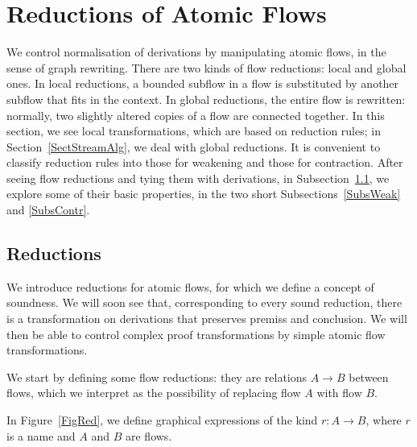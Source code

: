 \documentclass[a4paper]{LMCS}
\begin{document}
\section{Reductions of Atomic Flows}\label{SectRed}

We control normalisation of derivations by manipulating atomic flows, in the sense of graph rewriting. There are two kinds of flow reductions: local and global ones. In local reductions, a bounded subflow in a flow is substituted by another subflow that fits in the context. In global reductions, the entire flow is rewritten: normally, two slightly altered copies of a flow are connected together. In this section, we see local transformations, which are based on reduction rules; in Section~\ref{SectStreamAlg}, we deal with global reductions. It is convenient to classify reduction rules into those for weakening and those for contraction. After seeing flow reductions and tying them with derivations, in Subsection~\ref{SubsRed}, we explore some of their basic properties, in the two short Subsections~\ref{SubsWeak} and \ref{SubsContr}.

\subsection{Reductions}\label{SubsRed}

We introduce reductions for atomic flows, for which we define a concept of soundness. We will soon see that, corresponding to every sound reduction, there is a transformation on derivations that preserves premiss and conclusion. We will then be able to control complex proof transformations by simple atomic flow transformations.

We start by defining some flow reductions: they are relations $A\to B$ between flows, which we interpret as the possibility of replacing flow $A$ with flow $B$.

\begin{defi}
In Figure~\ref{FigRed}, we define graphical expressions of the kind $r\colon A\to B$, where $r$ is a name and $A$ and $B$ are flows.
\end{defi}
\end{document}
